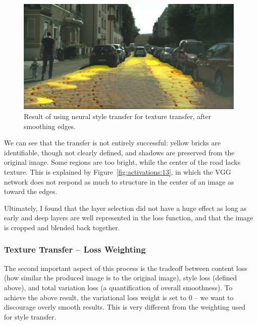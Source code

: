 \documentclass[10pt,twocolumn,letterpaper]{article}
\begin{document}
\begin{figure}[htb]
	\includegraphics[width=\hsize]{images/results/decent_texture_transfer_sw_100-tv_0-cw_0-01.png}
	\caption{Result of using neural style transfer for texture transfer, after smoothing edges.}
	\label{fig:retextured}
\end{figure}

We can see that the transfer is not entirely successful: yellow bricks are identifiable, though not clearly defined, and shadows are preserved from the original image. Some regions are too bright, while the center of the road lacks texture. This is explained by Figure~\ref{fig:activations:13}, in which the VGG network does not respond as much to structure in the center of an image as toward the edges.

Ultimately, I found that the layer selection did not have a huge effect as long as early and deep layers are well represented in the loss function, and that the image is cropped and blended back together. 

\subsubsection{Texture Transfer -- Loss Weighting}

The second important aspect of this process is the tradeoff between content loss (\eg how similar the produced image is to the original image), style loss (defined above), and total variation loss (a quantification of overall smoothness). To achieve the above result, the variational loss weight is set to 0 -- we want to discourage overly smooth results. This is very different from the weighting used for style transfer.
\end{document}
